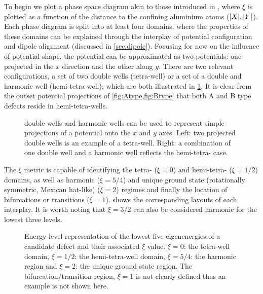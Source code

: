 To begin we plot a phase space diagram akin to those introduced in , where $\xi$ is plotted as a function of the distance to the confining aluminium atoms ($\lvert X\rvert,\lvert Y\rvert$).
Each phase diagram is split into at least four domains, where the properties of these domains can be explained through the interplay of potential configuration and dipole alignment (discussed in \cref{sec:dipole}).
Focusing for now on the influence of potential shape, the  potential can be approximated as two  potentials: one projected in the $x$ direction and the other along $y$.
There are two relevant configurations, a set of two double wells (tetra-well) or a set of a double and harmonic well (hemi-tetra-well); which are both illustrated in \cref{fig:mexhatproj}.
It is clear from the outset potential projections of \cref{fig:Atype,fig:Btype} that both A and B type defects reside in hemi-tetra-wells.

\begin{figure}[htp]
\resizebox{0.8\textwidth}{!}{}
\caption[Potential Projections]{\label{fig:mexhatproj} double wells  and harmonic wells  can be used to represent simple projections of a  potential onto the $x$ and $y$ axes. Left: two projected double wells is an example of a tetra-well. Right: a combination of one double well and a harmonic well reflects the hemi-tetra- case.}
\end{figure}

The $\xi$ metric is capable of identifying the tetra- ($\xi=0$) and hemi-tetra- ($\xi=1/2$) domains, as well as harmonic ($\xi=5/4$) and unique ground state (rotationally symmetric, Mexican hat-like) ($\xi=2$) regimes and finally the location of bifurcations or transitions ($\xi=1$).
 shows the corresponding layouts of each interplay.
It is worth noting that $\xi=3/2$ can also be considered harmonic for the lowest three levels.

\begin{figure}[htp]
  \resizebox{\textwidth}{!}{}
  \caption[$\xi$ Metric]{\label{fig:ximetric}Energy level representation of the lowest five eigenenergies of a candidate defect and their associated $\xi$ value. $\xi=0$: the tetra-well domain, $\xi=1/2$: the hemi-tetra-well domain, $\xi=5/4$: the harmonic region and $\xi=2$: the unique ground state region. The bifurcation/transition region, $\xi=1$ is not clearly defined thus an example is not shown here.}
\end{figure}

